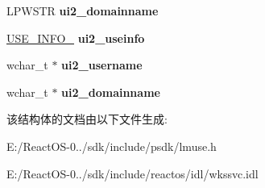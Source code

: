 \begin{DoxyCompactItemize}
\mbox{\label{struct___u_s_e___i_n_f_o__2_ae97f8ba50225225209be120727be7cac}} 
L\+P\+W\+S\+TR {\bfseries ui2\+\_\+domainname}
\item 
\mbox{\label{struct___u_s_e___i_n_f_o__2_a81f0742c0cbed2ce084aa4ed172e63a1}} 
\hyperlink{struct___u_s_e___i_n_f_o__1}{U\+S\+E\+\_\+\+I\+N\+F\+O\+\_} {\bfseries ui2\+\_\+useinfo}
\item 
\mbox{\label{struct___u_s_e___i_n_f_o__2_ae30d17e2522151e27724761ec9dac85d}} 
wchar\+\_\+t $\ast$ {\bfseries ui2\+\_\+username}
\item 
\mbox{\label{struct___u_s_e___i_n_f_o__2_ab9fc869489be938a05c423e312e25404}} 
wchar\+\_\+t $\ast$ {\bfseries ui2\+\_\+domainname}
\end{DoxyCompactItemize}


该结构体的文档由以下文件生成\+:\begin{DoxyCompactItemize}
\item 
E\+:/\+React\+O\+S-\/0../sdk/include/psdk/lmuse.\+h\item 
E\+:/\+React\+O\+S-\/0../sdk/include/reactos/idl/wkssvc.\+idl\end{DoxyCompactItemize}
